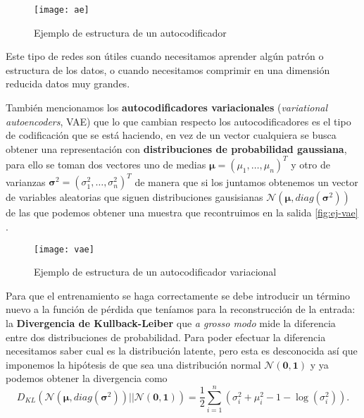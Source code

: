 \begin{figure}[htpb]
  \centering
  \texttt{[image: ae]}
  \caption{Ejemplo de estructura de un autocodificador}
  \label{fig:ej-ae}
\end{figure}

Este tipo de redes son útiles cuando necesitamos aprender algún patrón o estructura de los datos, o cuando necesitamos comprimir en una dimensión reducida datos muy grandes.

También mencionamos los \textbf{autocodificadores variacionales} (\emph{variational autoencoders}, VAE) que lo que cambian respecto los autocodificadores es el tipo de codificación que se está haciendo, en vez de un vector cualquiera
se busca obtener una representación con \textbf{distribuciones de probabilidad gaussiana}, para ello se toman dos vectores uno de medias $\pmb{\mu} = (\mu_1, \ldots, \mu_n)^T$ y otro de varianzas $\pmb{\sigma}^2 = (\sigma_1^2, \ldots, \sigma_n^2)^T$ de manera que si los juntamos obtenemos un vector de variables aleatorias que siguen distribuciones gausisianas $\mathcal{N}(\pmb{\mu}, diag(\pmb{\sigma}^2))$ de las que podemos obtener una muestra que recontruimos en la salida \autoref{fig:ej-vae} \cite{sancho2020ae}.

\begin{figure}[htpb]
  \centering
  \texttt{[image: vae]}
  \caption{Ejemplo de estructura de un autocodificador variacional}
  \label{fig:ej-vae}
\end{figure}

Para que el entrenamiento se haga correctamente se debe introducir un término nuevo a la función de pérdida que teníamos para la reconstrucción de la entrada: la \textbf{Divergencia de Kullback-Leiber} \cite{kullback1951information} que \emph{a grosso modo} mide la diferencia entre dos distribuciones de probabilidad. Para poder efectuar la diferencia necesitamos saber cual es la distribución latente, pero esta es desconocida así que imponemos la hipótesis de que sea una distribución normal $\mathcal{N}(\textbf{0}, \textbf{1})$ y ya podemos obtener la divergencia como
\begin{equation*}
  D_{KL}(\mathcal{N}(\pmb{\mu}, diag(\pmb{\sigma}^2)) || \mathcal{N}(\textbf{0}, \textbf{1})) = \dfrac{1}{2} \sum^{n}_{i = 1} \left(\sigma^2_i + \mu^2_i - 1 - \log(\sigma^2_i) \right).
  \label{eq:divergencia}
\end{equation*}

